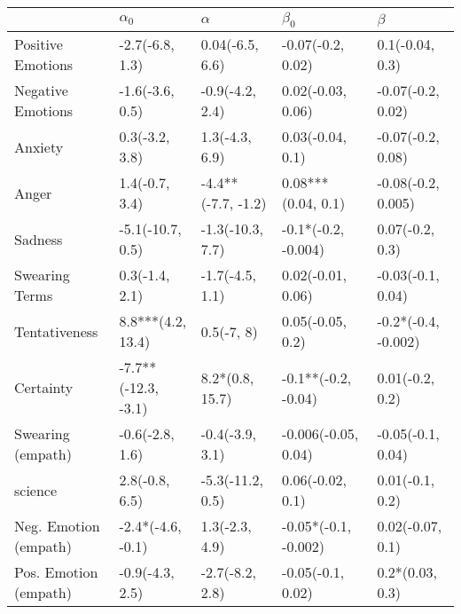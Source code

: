 \begin{tabular}{lllll}
\toprule
{} &           $\alpha_0$ &            $\alpha$ &             $\beta_0$ &              $\beta$ \\
\midrule
Positive Emotions     &      -2.7(-6.8, 1.3) &     0.04(-6.5, 6.6) &     -0.07(-0.2, 0.02) &      0.1(-0.04, 0.3) \\
Negative Emotions     &      -1.6(-3.6, 0.5) &     -0.9(-4.2, 2.4) &     0.02(-0.03, 0.06) &    -0.07(-0.2, 0.02) \\
Anxiety               &       0.3(-3.2, 3.8) &      1.3(-4.3, 6.9) &      0.03(-0.04, 0.1) &    -0.07(-0.2, 0.08) \\
Anger                 &       1.4(-0.7, 3.4) &  -4.4**(-7.7, -1.2) &    0.08***(0.04, 0.1) &   -0.08(-0.2, 0.005) \\
Sadness               &     -5.1(-10.7, 0.5) &    -1.3(-10.3, 7.7) &   -0.1*(-0.2, -0.004) &      0.07(-0.2, 0.3) \\
Swearing Terms        &       0.3(-1.4, 2.1) &     -1.7(-4.5, 1.1) &     0.02(-0.01, 0.06) &    -0.03(-0.1, 0.04) \\
Tentativeness         &    8.8***(4.2, 13.4) &          0.5(-7, 8) &      0.05(-0.05, 0.2) &  -0.2*(-0.4, -0.002) \\
Certainty             &  -7.7**(-12.3, -3.1) &     8.2*(0.8, 15.7) &   -0.1**(-0.2, -0.04) &      0.01(-0.2, 0.2) \\
Swearing (empath)     &      -0.6(-2.8, 1.6) &     -0.4(-3.9, 3.1) &   -0.006(-0.05, 0.04) &    -0.05(-0.1, 0.04) \\
science               &       2.8(-0.8, 6.5) &    -5.3(-11.2, 0.5) &      0.06(-0.02, 0.1) &      0.01(-0.1, 0.2) \\
Neg. Emotion (empath) &    -2.4*(-4.6, -0.1) &      1.3(-2.3, 4.9) &  -0.05*(-0.1, -0.002) &     0.02(-0.07, 0.1) \\
Pos. Emotion (empath) &      -0.9(-4.3, 2.5) &     -2.7(-8.2, 2.8) &     -0.05(-0.1, 0.02) &      0.2*(0.03, 0.3) \\
\bottomrule
\end{tabular}

